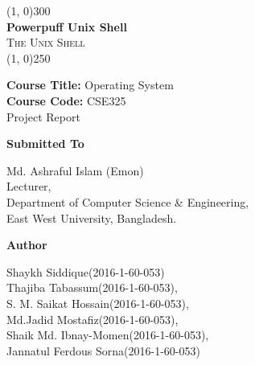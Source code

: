 \documentclass[12pt]{article}
\begin{document}
 \begin{titlepage}

    \begin{center}
        \line(1, 0){300}\\
        [0.20in]
        \huge{\bfseries Powerpuff Unix Shell} \\
        \textsc{\Large The Unix Shell}\\
        \line(1, 0){250}\\
        \vspace{1mm}
        
    \end{center}
    
    \begin{center}
        \textbf{Course Title:} Operating System\\
        \textbf{Course Code:} CSE325\\
        \vspace{10mm}
        \huge{Project Report}
    \end{center}
    
    \vspace{20mm}
    \textbf{Submitted To} 
    
    \begin{center}
        Md. Ashraful Islam (Emon) \\
        Lecturer, \\
        Department of Computer Science \& Engineering, \\
        East West University, Bangladesh.
    \end{center}
    \vspace{20mm}
    \hspace{5mm}
    \textbf{Author}
    \begin{flushleft}
        \hspace{40mm}
        Shaykh Siddique(2016-1-60-053)\\ \hspace{40mm}
        Thajiba Tabassum(2016-1-60-053),\\ \hspace{40mm}
        S. M. Saikat Hossain(2016-1-60-053),\\ \hspace{40mm}
        Md.Jadid Mostafiz(2016-1-60-053),\\ \hspace{40mm}
        Shaik Md. Ibnay-Momen(2016-1-60-053),\\ \hspace{40mm}
        Jannatul Ferdous Sorna(2016-1-60-053)
    \end{flushleft}

    \end{titlepage}
    
\end{document}

